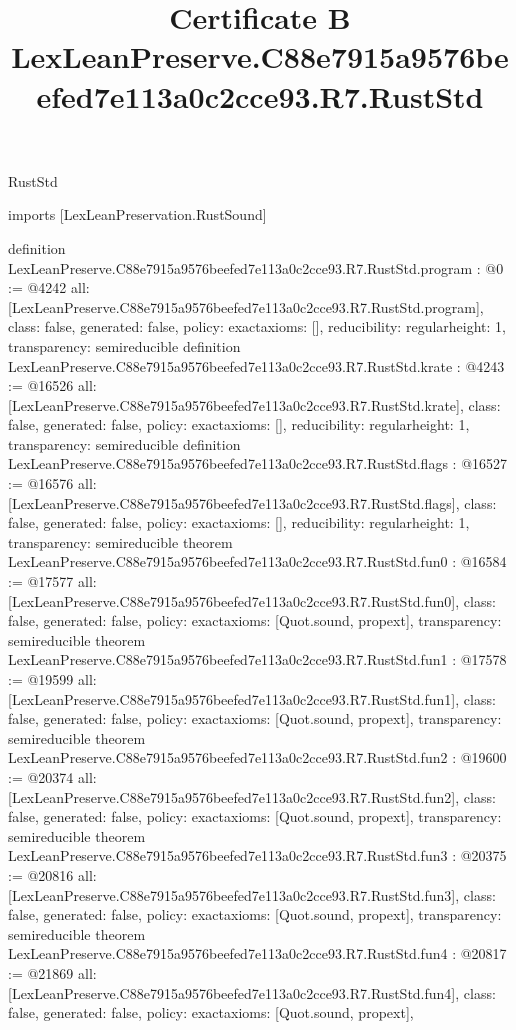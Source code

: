 \begin{lexlean}{RustStd}
\title{Certificate B LexLeanPreserve.C88e7915a9576beefed7e113a0c2cce93.R7.RustStd}
\begin{coremodule}
imports [LexLeanPreservation.RustSound]

definition LexLeanPreserve.C88e7915a9576beefed7e113a0c2cce93.R7.RustStd.program : @0 := @4242 {
  all: [LexLeanPreserve.C88e7915a9576beefed7e113a0c2cce93.R7.RustStd.program],
  class: false,
  generated: false,
  policy: exact{axioms: []},
  reducibility: regular{height: 1},
  transparency: semireducible
}
definition LexLeanPreserve.C88e7915a9576beefed7e113a0c2cce93.R7.RustStd.krate : @4243 := @16526 {
  all: [LexLeanPreserve.C88e7915a9576beefed7e113a0c2cce93.R7.RustStd.krate],
  class: false,
  generated: false,
  policy: exact{axioms: []},
  reducibility: regular{height: 1},
  transparency: semireducible
}
definition LexLeanPreserve.C88e7915a9576beefed7e113a0c2cce93.R7.RustStd.flags : @16527 := @16576 {
  all: [LexLeanPreserve.C88e7915a9576beefed7e113a0c2cce93.R7.RustStd.flags],
  class: false,
  generated: false,
  policy: exact{axioms: []},
  reducibility: regular{height: 1},
  transparency: semireducible
}
theorem LexLeanPreserve.C88e7915a9576beefed7e113a0c2cce93.R7.RustStd.fun0 : @16584 := @17577 {
  all: [LexLeanPreserve.C88e7915a9576beefed7e113a0c2cce93.R7.RustStd.fun0],
  class: false,
  generated: false,
  policy: exact{axioms: [Quot.sound, propext]},
  transparency: semireducible
}
theorem LexLeanPreserve.C88e7915a9576beefed7e113a0c2cce93.R7.RustStd.fun1 : @17578 := @19599 {
  all: [LexLeanPreserve.C88e7915a9576beefed7e113a0c2cce93.R7.RustStd.fun1],
  class: false,
  generated: false,
  policy: exact{axioms: [Quot.sound, propext]},
  transparency: semireducible
}
theorem LexLeanPreserve.C88e7915a9576beefed7e113a0c2cce93.R7.RustStd.fun2 : @19600 := @20374 {
  all: [LexLeanPreserve.C88e7915a9576beefed7e113a0c2cce93.R7.RustStd.fun2],
  class: false,
  generated: false,
  policy: exact{axioms: [Quot.sound, propext]},
  transparency: semireducible
}
theorem LexLeanPreserve.C88e7915a9576beefed7e113a0c2cce93.R7.RustStd.fun3 : @20375 := @20816 {
  all: [LexLeanPreserve.C88e7915a9576beefed7e113a0c2cce93.R7.RustStd.fun3],
  class: false,
  generated: false,
  policy: exact{axioms: [Quot.sound, propext]},
  transparency: semireducible
}
theorem LexLeanPreserve.C88e7915a9576beefed7e113a0c2cce93.R7.RustStd.fun4 : @20817 := @21869 {
  all: [LexLeanPreserve.C88e7915a9576beefed7e113a0c2cce93.R7.RustStd.fun4],
  class: false,
  generated: false,
  policy: exact{axioms: [Quot.sound, propext]},
}
\end{coremodule}
\end{lexlean}
